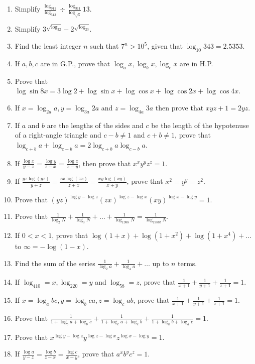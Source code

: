 \begin{enumerate}
\item Simplify $\frac{\log_911}{\log_513}\div\frac{\log_311}{\log_{\sqrt{5}}}13$.
\item Simplify $3^{\sqrt{\log_32}} - 2^{\sqrt{\log_23}}$.
\item Find the least integer $n$ such that $7^n > 10^5$, given that $\log_{10}343 = 2.5353$.
\item If $a, b, c$ are in G.P., prove that $\log_ax, \log_bx, \log_cx$ are in H.P.
\item Prove that $\log\sin8x = 3\log2 + \log\sin x + \log\cos x + \log\cos2x + \log\cos4x$.
\item If $x = \log_{2a}a, y = \log_{3a}2a$ and $z = \log_{4a}3a$ then prove that $xyz + 1 = 2yz$.
\item If $a$ and $b$ are the lengths of the sides and $c$ be the length of the hypotenuse of a right-angle triangle and $c - b \neq
  1$ and $c + b\neq 1$, prove that $\log_{c + b}a + \log_{c - b}a = 2\log_{c + b}a\log_{c - b}a$.
\item If $\frac{\log x}{y - z} = \frac{\log y}{z - x} = \frac{\log z}{x - y}$, then prove that $x^xy^yz^z = 1$.
\item If $\frac{yz\log(yz)}{y + z} = \frac{zx\log(zx)}{z + x} = \frac{xy\log(xy)}{x + y}$, prove that $x^2 = y^y = z^2$.
\item Prove that $(yz)^{\log y - \log z}(zx)^{\log z - \log x}(xy)^{\log x - \log y} = 1$.
\item Prove that $\frac{1}{\log_2N} + \frac{1}{\log_3N} + \ldots + \frac{1}{\log_{1988}N} = \frac{1}{\log_{1988!}N}$.
\item If $0<x<1$, prove that $\log(1 + x) + \log(1 + x^2) + \log(1 + x^4) + \ldots$ to $\infty = -\log(1 - x)$.
\item Find the sum of the series $\frac{1}{\log_2a} + \frac{1}{\log_4a} + \ldots$ up to $n$ terms.
\item If $\log_410 = x, \log_220 = y$ and $\log_58 = z$, prove that $\frac{1}{x + 1} + \frac{1}{y + 1} + \frac{1}{z + 1} = 1$.
\item If $x = \log_abc, y = \log_bca, z = \log_cab$, prove that $\frac{1}{x + 1} + \frac{1}{y + 1} + \frac{1}{z + 1} = 1$.
\item Prove that $\frac{1}{1 + \log_ba + \log_bc} + \frac{1}{1 + \log_ca + \log_cb} + \frac{1}{1 + \log_ab + \log_ac} = 1$.
\item Prove that $x^{\log y - \log z}y^{\log z - \log x}z^{\log x - \log y} = 1$.
\item If $\frac{\log a}{y - z} = \frac{\log b}{z - x} = \frac{\log c}{x - y}$, prove that $a^xb^yc^z = 1$.

\end{enumerate}
